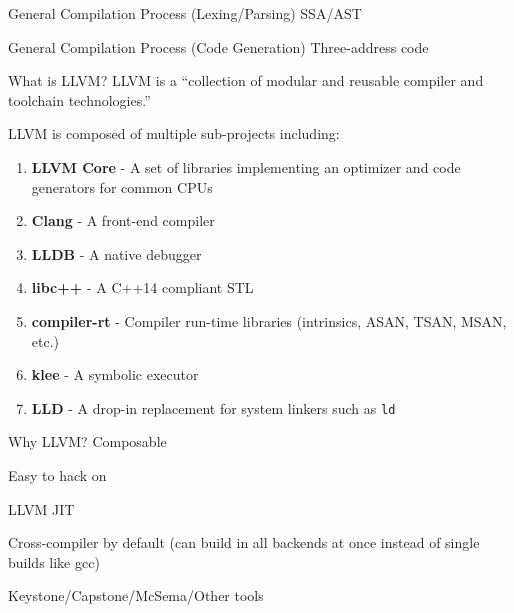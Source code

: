 \documentclass{beamer}
\begin{document}
\begin{frame}{General Compilation Process (Lexing/Parsing)}
SSA/AST
\end{frame}

\begin{frame}{General Compilation Process (Code Generation)}
Three-address code
\end{frame}


\begin{frame}{What is LLVM?}
    LLVM is a ``collection of modular and reusable compiler and toolchain technologies.'' \cite{llvm_org}
    \vspace{1em}

    LLVM is composed of multiple sub-projects including:
    {\footnotesize
    \begin{enumerate}
        \item \textbf{LLVM Core} - A set of libraries implementing an optimizer and code generators for common CPUs
        \item \textbf{Clang} - A front-end compiler
        \item \textbf{LLDB} - A native debugger
        \item \textbf{libc++} - A C++14 compliant STL
        \item \textbf{compiler-rt} - Compiler run-time libraries (intrinsics, ASAN, TSAN, MSAN, etc.)
        \item \textbf{klee} - A symbolic executor
        \item \textbf{LLD} - A drop-in replacement for system linkers such as \texttt{ld}
    \end{enumerate}
    }
\end{frame}

\begin{frame}{Why LLVM?}
    Composable

    Easy to hack on

    LLVM JIT

    Cross-compiler by default (can build in all backends at once instead of single builds like gcc)

    Keystone/Capstone/McSema/Other tools
\end{frame}
\end{document}
